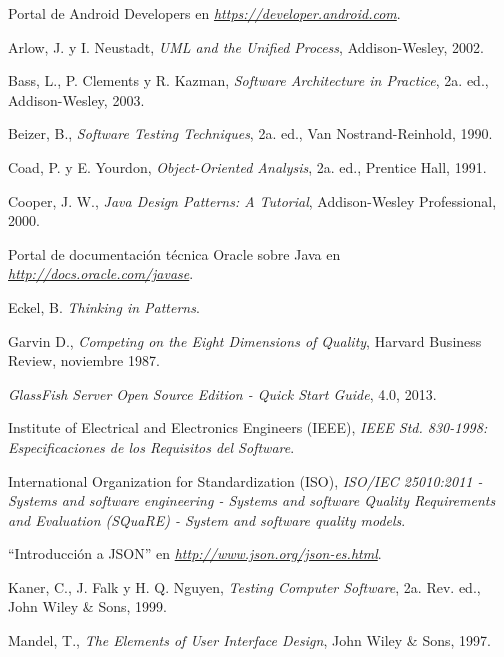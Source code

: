 \begin{thebibliography}{} %
	
	Portal de Android Developers en
	\emph{\url{https://developer.android.com}}.
	
	Arlow, J. y I. Neustadt, 
	\emph{UML and the Unified Process}, 
	Addison-Wesley, 
	2002.
	
	Bass, L., P. Clements y R. Kazman, 
	\emph{Software Architecture in Practice}, 
	2a. ed., 
	Addison-Wesley, 
	2003.
	
	Beizer, B., 
	\emph{Software Testing Techniques}, 
	2a. ed., 
	Van Nostrand-Reinhold, 
	1990.

	Coad, P. y E. Yourdon, 
	\emph{Object-Oriented Analysis}, 
	2a. ed., 
	Prentice Hall, 
	1991.
	
	Cooper, J. W.,
	\emph{Java Design Patterns: A Tutorial}, 
	Addison-Wesley Professional, 
	2000.
	
	Portal de documentación técnica Oracle sobre Java en
	\emph{\url{http://docs.oracle.com/javase}}.
	
	Eckel, B.
	\emph{Thinking in Patterns}.
	
	Garvin D.,
	\emph{Competing on the Eight Dimensions of Quality},
	Harvard Business Review, 
	noviembre 1987.
	
	\emph{GlassFish Server Open Source Edition - Quick Start Guide},
	4.0,
	2013.
	
	Institute of Electrical and Electronics Engineers (IEEE),
	\emph{IEEE Std. 830-1998: Especificaciones de los Requisitos del Software}.
	
	International Organization for Standardization (ISO),
	\emph{ISO/IEC 25010:2011 - Systems and software engineering - Systems and software Quality Requirements and Evaluation (SQuaRE) - System and software quality models}.
	
	``Introducción a JSON'' en
	\emph{\url{http://www.json.org/json-es.html}}.
	
	Kaner, C., J. Falk y H. Q. Nguyen,
	\emph{Testing Computer Software},
	2a. Rev. ed.,
	John Wiley \& Sons, 
	1999.
	
	Mandel, T.,
	\emph{The Elements of User Interface Design},
	John Wiley \& Sons, 
	1997.
		

\end{thebibliography}
